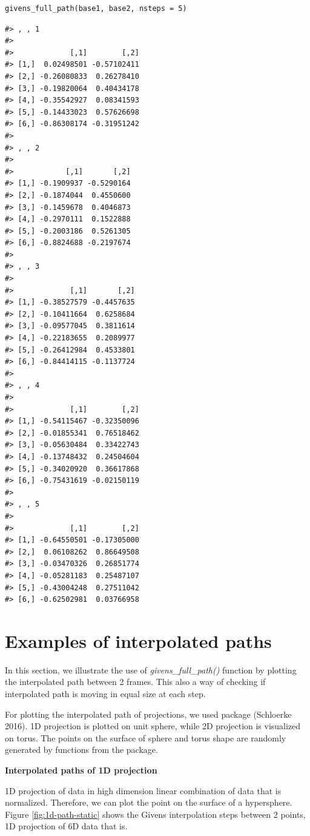 \begin{verbatim}
givens_full_path(base1, base2, nsteps = 5)
\end{verbatim}

\begin{verbatim}
#> , , 1
#> 
#>             [,1]        [,2]
#> [1,]  0.02498501 -0.57102411
#> [2,] -0.26080833  0.26278410
#> [3,] -0.19820064  0.40434178
#> [4,] -0.35542927  0.08341593
#> [5,] -0.14433023  0.57626698
#> [6,] -0.86308174 -0.31951242
#> 
#> , , 2
#> 
#>            [,1]       [,2]
#> [1,] -0.1909937 -0.5290164
#> [2,] -0.1874044  0.4550600
#> [3,] -0.1459678  0.4046873
#> [4,] -0.2970111  0.1522888
#> [5,] -0.2003186  0.5261305
#> [6,] -0.8824688 -0.2197674
#> 
#> , , 3
#> 
#>             [,1]       [,2]
#> [1,] -0.38527579 -0.4457635
#> [2,] -0.10411664  0.6258684
#> [3,] -0.09577045  0.3811614
#> [4,] -0.22183655  0.2089977
#> [5,] -0.26412984  0.4533801
#> [6,] -0.84414115 -0.1137724
#> 
#> , , 4
#> 
#>             [,1]        [,2]
#> [1,] -0.54115467 -0.32350096
#> [2,] -0.01855341  0.76518462
#> [3,] -0.05630484  0.33422743
#> [4,] -0.13748432  0.24504604
#> [5,] -0.34020920  0.36617868
#> [6,] -0.75431619 -0.02150119
#> 
#> , , 5
#> 
#>             [,1]        [,2]
#> [1,] -0.64550501 -0.17305000
#> [2,]  0.06108262  0.86649508
#> [3,] -0.03470326  0.26851774
#> [4,] -0.05281183  0.25487107
#> [5,] -0.43004248  0.27511042
#> [6,] -0.62502981  0.03766958
\end{verbatim}

\hypertarget{examples-of-interpolated-paths}{%
\section{Examples of interpolated paths}\label{examples-of-interpolated-paths}}

In this section, we illustrate the use of \emph{givens\_full\_path()} function by plotting the interpolated path between 2 frames. This also a way of checking if interpolated path is moving in equal size at each step.

For plotting the interpolated path of projections, we used  package (Schloerke 2016). 1D projection is plotted on unit sphere, while 2D projection is visualized on torus. The points on the surface of sphere and torus shape are randomly generated by functions from the  package.

\textbf{Interpolated paths of 1D projection}

1D projection of data in high dimension linear combination of data that is normalized. Therefore, we can plot the point on the surface of a hypersphere. Figure \ref{fig:1d-path-static} shows the Givens interpolation steps between 2 points, 1D projection of 6D data that is.

